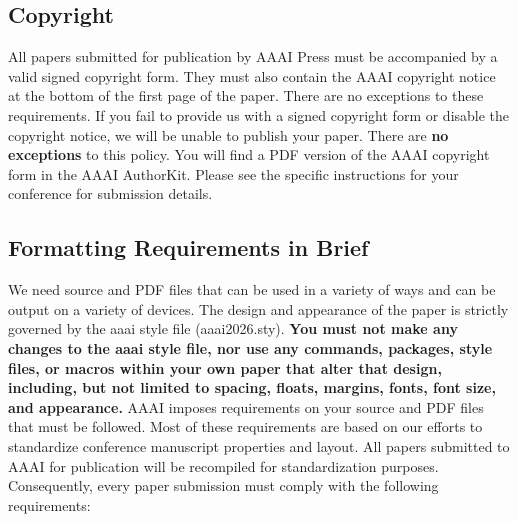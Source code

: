 \subsection{Copyright}\label{copyright}

All papers submitted for publication by AAAI Press must be accompanied
by a valid signed copyright form. They must also contain the AAAI
copyright notice at the bottom of the first page of the paper. There are
no exceptions to these requirements. If you fail to provide us with a
signed copyright form or disable the copyright notice, we will be unable
to publish your paper. There are \textbf{no exceptions} to this policy.
You will find a PDF version of the AAAI copyright form in the AAAI
AuthorKit. Please see the specific instructions for your conference for
submission details.

\subsection{Formatting Requirements in
Brief}\label{formatting-requirements-in-brief}

We need source and PDF files that can be used in a variety of ways and
can be output on a variety of devices. The design and appearance of the
paper is strictly governed by the aaai style file (aaai2026.sty).
\textbf{You must not make any changes to the aaai style file, nor use
any commands, packages, style files, or macros within your own paper
that alter that design, including, but not limited to spacing, floats,
margins, fonts, font size, and appearance.} AAAI imposes requirements on
your source and PDF files that must be followed. Most of these
requirements are based on our efforts to standardize conference
manuscript properties and layout. All papers submitted to AAAI for
publication will be recompiled for standardization purposes.
Consequently, every paper submission must comply with the following
requirements:

